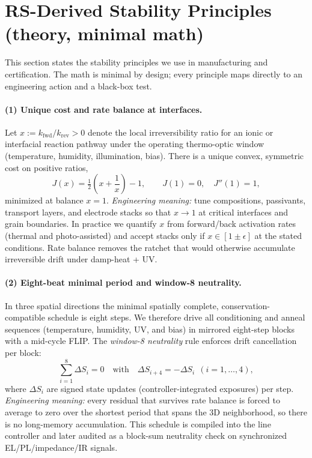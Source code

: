 \documentclass[12pt]{article}
\begin{document}
\section{RS-Derived Stability Principles (theory, minimal math)}

This section states the stability principles we use in manufacturing and certification. The math is minimal by design; every principle maps directly to an engineering action and a black-box test.

\paragraph{(1) Unique cost and rate balance at interfaces.}
Let $x:=k_{\text{fwd}}/k_{\text{rev}}>0$ denote the local irreversibility ratio for an ionic or interfacial reaction pathway under the operating thermo-optic window (temperature, humidity, illumination, bias). There is a unique convex, symmetric cost on positive ratios,
\begin{equation}
J(x)=\tfrac12\!\left(x+\frac{1}{x}\right)-1,\qquad J(1)=0,\quad J''(1)=1,
\end{equation}
minimized at balance $x=1$. \emph{Engineering meaning:} tune compositions, passivants, transport layers, and electrode stacks so that $x\to 1$ at critical interfaces and grain boundaries. In practice we quantify $x$ from forward/back activation rates (thermal and photo-assisted) and accept stacks only if $x\in[1\pm\epsilon]$ at the stated conditions. Rate balance removes the ratchet that would otherwise accumulate irreversible drift under damp-heat + UV.

\paragraph{(2) Eight-beat minimal period and window-8 neutrality.}
In three spatial directions the minimal spatially complete, conservation-compatible schedule is eight steps. We therefore drive all conditioning and anneal sequences (temperature, humidity, UV, and bias) in mirrored eight-step blocks with a mid-cycle FLIP. The \emph{window-8 neutrality} rule enforces drift cancellation per block:
\begin{equation}
\sum_{i=1}^{8}\Delta S_i=0\quad\text{with}\quad \Delta S_{i+4}=-\Delta S_i\ \ (i=1,\dots,4),
\end{equation}
where $\Delta S_i$ are signed state updates (controller-integrated exposures) per step. \emph{Engineering meaning:} every residual that survives rate balance is forced to average to zero over the shortest period that spans the 3D neighborhood, so there is no long-memory accumulation. This schedule is compiled into the line controller and later audited as a block-sum neutrality check on synchronized EL/PL/impedance/IR signals.
\end{document}
